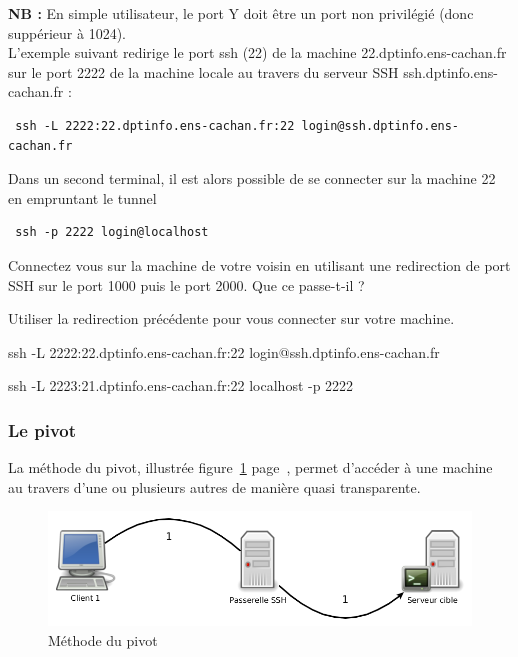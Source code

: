 \documentclass[11pt]{article}
\begin{document}
\noindent \textbf{NB : } En simple utilisateur, le port Y doit être un port non privilégié (donc suppérieur à 1024).\\

L'exemple suivant redirige le port ssh (22) de la machine 22.dptinfo.ens-cachan.fr sur le port 2222 de la machine locale au travers du serveur SSH ssh.dptinfo.ens-cachan.fr :

\begin{lstlisting}
 ssh -L 2222:22.dptinfo.ens-cachan.fr:22 login@ssh.dptinfo.ens-cachan.fr
\end{lstlisting}

Dans un second terminal, il est alors possible de se connecter sur la machine 22 en empruntant le tunnel

\begin{lstlisting}
 ssh -p 2222 login@localhost
\end{lstlisting}

Connectez vous sur la machine de votre voisin en utilisant une redirection de port SSH sur le port 1000 puis le port 2000. Que ce passe-t-il ?

Utiliser la redirection précédente pour vous connecter sur votre machine.

\begin{solution}

ssh -L 2222:22.dptinfo.ens-cachan.fr:22 login@ssh.dptinfo.ens-cachan.fr

ssh -L 2223:21.dptinfo.ens-cachan.fr:22 localhost -p 2222

\end{solution}

\subsubsection{Le pivot}

La méthode du pivot, illustrée figure~\ref{pivot} page~\pageref{pivot}, permet d'accéder à une machine au travers d'une ou plusieurs autres de manière quasi transparente.\\

\begin{figure}[h]
 \centering
 \includegraphics[width=15cm]{pivot}
 \caption{\label{pivot}Méthode du pivot}
\end{figure}
\end{document}
